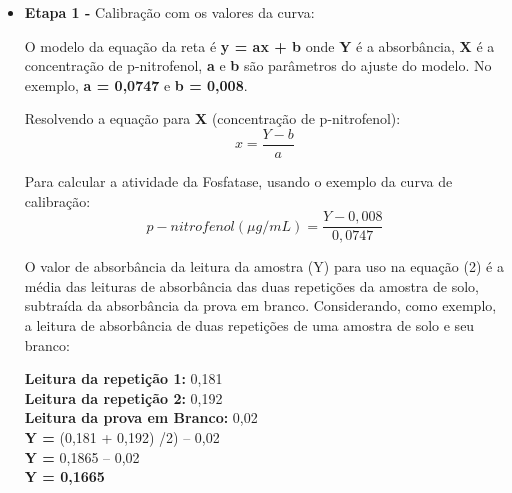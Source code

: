 \begin{itemize}
   \item \textbf{Etapa 1 -} Calibração com os valores da curva:
   \begin{table}[H]
    \centering
    \caption{Relação de concentração x absorbância da solução}
    \label{table:requisitos_funcionais}
    \end{table}

    O modelo da equação da reta é \textbf{y = ax + b} onde \textbf{Y} é a absorbância, \textbf{X} é a concentração de p-nitrofenol, \textbf{a} e \textbf{b} são parâmetros do ajuste do modelo. No exemplo, \textbf{a = 0,0747} e \textbf{b = 0,008}.

    Resolvendo a equação para \textbf{X} (concentração de p-nitrofenol):
    \[x = \frac{Y - b}{a}\]

    Para calcular a atividade da Fosfatase, usando o exemplo da curva de calibração:
    \[p-nitrofenol (\mu g/mL) = \frac{Y - 0,008}{0,0747}\]

    O valor de absorbância da leitura da amostra (Y) para uso na equação (2) é a média das leituras de absorbância das duas repetições da amostra de solo, subtraída da absorbância da prova em branco. Considerando, como exemplo, a leitura de absorbância de duas repetições de uma amostra de solo e seu branco:

    \textbf{Leitura da repetição 1:} 0,181 \\
    \textbf{Leitura da repetição 2:} 0,192 \\
    \textbf{Leitura da prova em Branco:} 0,02 \\
    \textbf{Y =} (0,181 + 0,192) /2) – 0,02 \\
    \textbf{Y =} 0,1865 – 0,02 \\
    \textbf{Y = 0,1665} \\


\end{itemize}

